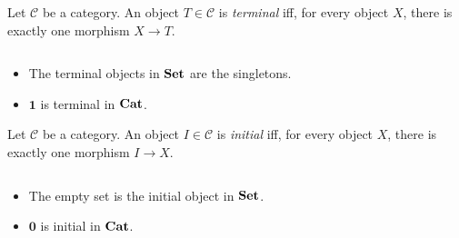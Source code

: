 \begin{df}
Let $\mathcal{C}$ be a category.
An object $T \in \mathcal{C}$ is \emph{terminal} iff, for every object $X$, there is exactly one morphism $X \rightarrow T$.
\end{df}

\begin{ex}$ $
\begin{itemize}
\item The terminal objects in $\mathbf{Set}$ are the singletons.
\item $\mathbf{1}$ is terminal in $\mathbf{Cat}$.
\end{itemize}
\end{ex}

\begin{df}
Let $\mathcal{C}$ be a category.
An object $I \in \mathcal{C}$ is \emph{initial} iff, for every object $X$, there is exactly one morphism $I \rightarrow X$.
\end{df}

\begin{ex}$ $
\begin{itemize}
\item
The empty set is the initial object in $\mathbf{Set}$.
\item
$\mathbf{0}$ is initial in $\mathbf{Cat}$.
\end{itemize}
\end{ex}

